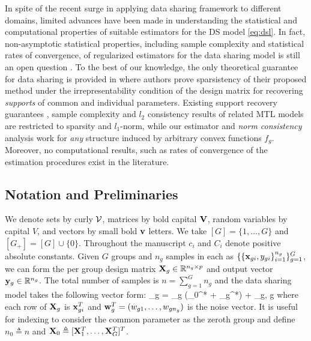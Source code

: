 In spite of the recent surge in applying data sharing framework to different domains, limited advances have been made in
understanding the statistical and computational properties of suitable estimators for the DS model \eqref{eq:dsl}.
In fact, non-asymptotic statistical properties, including sample complexity and statistical rates of convergence, of regularized estimators for the data sharing model is still an open question \cite{grti16, olvi14}.
To the best of our knowledge, the only theoretical guarantee for data sharing is provided in \cite{olvi15} where authors prove sparsistency of their proposed method under the irrepresentability condition of the design matrix for recovering \emph{supports} of common and individual parameters.
Existing support recovery guarantees \cite{olvi15}, sample complexity and $l_2$ consistency results \cite{jrsr10} of related MTL models are restricted to sparsity and $l_1$-norm, while our estimator and \emph{norm consistency} analysis work for \emph{any} structure induced by arbitrary convex functions $f_g$. 
Moreover, no computational results, such as rates of convergence of the estimation procedures exist in the literature.


\subsection{Notation and Preliminaries}
We denote sets by curly $\cV$, matrices by bold capital $\mathbf{V}$, random variables by capital $V$, and vectors by small bold $\mathbf{v}$ letters.
We take $[G] = \{1, \dots, G\}$ and $[G_+] = [G] \cup \{0\}$. Throughout the manuscript $c_i$ and $C_i$ denote positive absolute constants.
Given $G$ groups and $n_g$ samples in each as $\{ \{\mathbf{x}_{gi}, y_{gi} \}_{i=1}^{n_g} \}_{g = 1}^G$, we can form the per group design matrix $\mathbf{X}_g \in \mathbb R^{n_g \times p}$ and output vector $\mathbf{y}_g \in \mathbb R ^{n_g}$.
The total number of samples is  $n = \sum_{g = 1}^{G} n_g$ and the data sharing model takes the following vector form:
\beq \label{eq:dirtymodel}
\y_g = \X_g (\bbeta _0^* + \bbeta _g^*) + \w_g,  \quad \forall g \in [G]
\eeq
where each row of $\mathbf{X}_g$ is $\mathbf{x}_{gi}^T$ and $\mathbf{w}_g^T = (w_{g1}, \dots, w_{gn_g})$ is the noise vector. It is useful for indexing to consider the common parameter as the zeroth group and define $n_0 \triangleq n$ and $\mathbf{X}_0 \triangleq [\mathbf{X}_1^T, \dots, \mathbf{X}_G^T]^T$.

